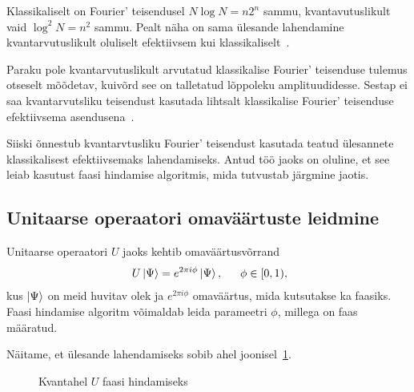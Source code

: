 \documentclass[12pt]{report}
\def\ket#1{\mathinner{|#1\rangle}}
\begin{document}
Klassikaliselt on Fourier' teisendusel \(N \log{N}=n 2^n \) sammu, kvantavutuslikult vaid \(\log^2{N} = n^2\) sammu.
Pealt näha on sama ülesande lahendamine kvantarvutuslikult oluliselt efektiivsem kui klassikaliselt~\cite{nielsen+chuang}.

Paraku pole kvantarvutuslikult arvutatud klassikalise Fourier' teisenduse tulemus otseselt mõõdetav, kuivõrd see on talletatud lõppoleku amplituudidesse.
Sestap ei saa kvantarvutsliku teisendust kasutada lihtsalt klassikalise Fourier' teisenduse efektiivsema asendusena~\cite{nielsen+chuang}.

Siiski õnnestub kvantarvtusliku Fourier' teisendust kasutada teatud ülesannete klassikalisest efektiivsemaks lahendamiseks.
Antud töö jaoks on oluline, et see leiab kasutust faasi hindamise algoritmis, mida tutvustab järgmine jaotis.

\subsection{Unitaarse operaatori omaväärtuste leidmine}\label{sec:unit}

Unitaarse operaatori \(U\) jaoks kehtib omaväärtusvõrrand
\begin{align}
    U\ket{\Psi} = e^{2\pi i\phi}\ket{\Psi} \rlap{,}
    \qquad \phi \in [0,1) \rlap{,}
\end{align}
kus \(\ket{\Psi}\) on meid huvitav olek ja \(e^{2\pi i\phi}\) omaväärtus, mida kutsutakse ka faasiks.
Faasi hindamise algoritm võimaldab leida parameetri \(\phi\), millega on faas määratud.

Näitame, et ülesande lahendamiseks sobib ahel joonisel~\ref{fig:pea}.

\begin{figure}[h]
    \centering
    \ifdefined\yquanton
    \fi
    \caption{Kvantahel \(U\) faasi hindamiseks \cite{nielsen+chuang, kaye+laflamme+mosca}}
    \label{fig:pea}
\end{figure}
\end{document}

